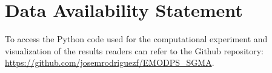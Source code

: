 \documentclass[a4paper,fleqn]{cas-sc}
\begin{document}
\section*{Data Availability Statement}

To access the Python code used for the computational experiment and  visualization of the results readers can refer to the Github repository: \url{https://github.com/josemrodriguezf/EMODPS_SGMA}.

\printcredits


% 



\end{document}

